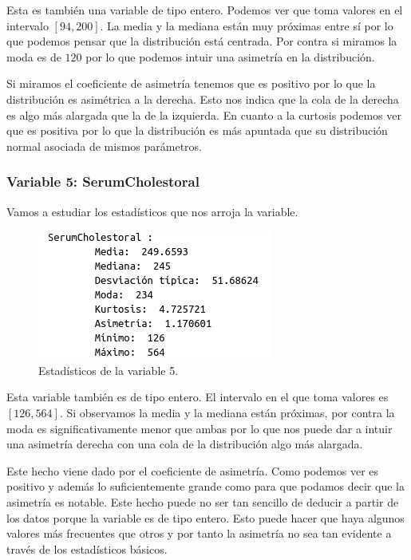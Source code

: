\documentclass[12pt,a4paper]{article}
\begin{document}
Esta es también una variable de tipo entero. Podemos ver que toma valores en el intervalo $[94, 200]$. La media y la mediana están muy próximas entre sí por lo que podemos pensar que la distribución está centrada. Por contra si miramos la moda es de $120$ por lo que podemos intuir una asimetría en la distribución.

Si miramos el coeficiente de asimetría tenemos que es positivo por lo que la distribución es asimétrica a la derecha. Esto nos indica que la cola de la derecha es algo más alargada que la de la izquierda. En cuanto a la curtosis podemos ver que es positiva por lo que la distribución es más apuntada que su distribución normal asociada de mismos parámetros.

\subsubsection*{Variable 5: SerumCholestoral}

Vamos a estudiar los estadísticos que nos arroja la variable.

\begin{figure}[H]
	\centering
	\includegraphics[scale=0.7]{./Imagenes/EDA/Clasificacion/estadisticos_variable5.png}
	\caption{Estadísticos de la variable 5.}
\end{figure}

Esta variable también es de tipo entero. El intervalo en el que toma valores es $[126,564]$. Si observamos la media y la mediana están próximas, por contra la moda es significativamente menor que ambas por lo que nos puede dar a intuir una asimetría derecha con una cola de la distribución algo más alargada.

Este hecho viene dado por el coeficiente de asimetría. Como podemos ver es positivo y además lo suficientemente grande como para que podamos decir que la asimetría es notable. Este hecho puede no ser tan sencillo de deducir a partir de los datos porque la variable es de tipo entero. Esto puede hacer que haya algunos valores más frecuentes que otros y por tanto la asimetría no sea tan evidente a través de los estadísticos básicos. 
\end{document}
